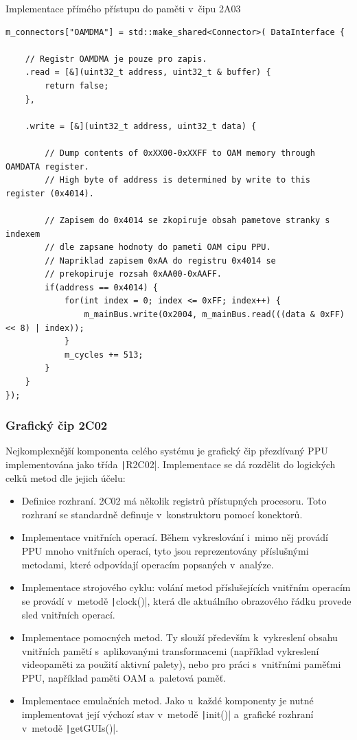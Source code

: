 \begin{listing}
	\caption{Implementace přímého přístupu do paměti v~čipu 2A03}
	\label{list:use-2a03-dma}
	\begin{verbatim}
m_connectors["OAMDMA"] = std::make_shared<Connector>( DataInterface {

	// Registr OAMDMA je pouze pro zapis.
	.read = [&](uint32_t address, uint32_t & buffer) {
		return false;
	},

	.write = [&](uint32_t address, uint32_t data) {
		
		// Dump contents of 0xXX00-0xXXFF to OAM memory through OAMDATA register.
		// High byte of address is determined by write to this register (0x4014).

		// Zapisem do 0x4014 se zkopiruje obsah pametove stranky s indexem
		// dle zapsane hodnoty do pameti OAM cipu PPU.
		// Napriklad zapisem 0xAA do registru 0x4014 se
		// prekopiruje rozsah 0xAA00-0xAAFF.
		if(address == 0x4014) {
			for(int index = 0; index <= 0xFF; index++) {
				m_mainBus.write(0x2004, m_mainBus.read(((data & 0xFF) << 8) | index));
			}
			m_cycles += 513;
		}
	}
});
	\end{verbatim}
\end{listing}

\subsubsection{Grafický čip 2C02}
Nejkomplexnější komponenta celého systému je grafický čip přezdívaný PPU implementována jako třída \texttt|R2C02|. Implementace se dá rozdělit do logických celků metod dle jejich účelu:
\begin{itemize}
	\item Definice rozhraní. 2C02 má několik registrů přístupných procesoru. Toto rozhraní se standardně definuje v~konstruktoru pomocí konektorů.
	\item Implementace vnitřních operací. Během vykreslování i~mimo něj provádí PPU mnoho vnitřních operací, tyto jsou reprezentovány příslušnými metodami, které odpovídají operacím popsaných v~analýze.
	\item Implementace strojového cyklu: volání metod příslušejících vnitřním operacím se provádí v~metodě \texttt|clock()|, která dle aktuálního obrazového řádku provede sled vnitřních operací.
	\item Implementace pomocných metod. Ty slouží především k~vykreslení obsahu vnitřních pamětí s~aplikovanými transformacemi (například vykreslení videopaměti za použití aktivní palety), nebo pro práci s~vnitřními paměťmi PPU, například paměti OAM a~paletová paměť.
	\item Implementace emulačních metod. Jako u~každé komponenty je nutné implementovat její výchozí stav v~metodě \texttt|init()| a~grafické rozhraní v~metodě \texttt|getGUIs()|.
\end{itemize}

